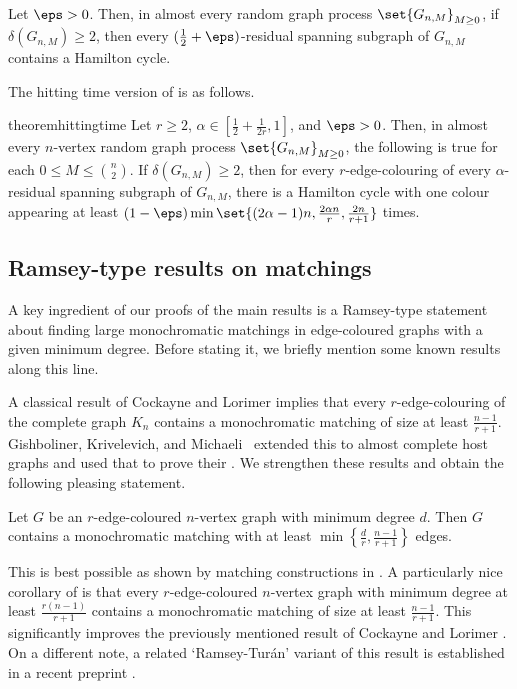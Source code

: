 \documentclass[10pt,a4paper,reqno]{amsart}
\begin{document}
\begin{theorem} 
\label{thm:hittimg time montgomery}
Let $\eps >0$. Then, in almost every random graph process $\set{G_{n,M}}_{M \geq 0}$, if $\delta(G_{n,M}) \geq 2$, then every $(\frac{1}{2}+\eps)$-residual spanning subgraph of $G_{n,M}$ contains a Hamilton cycle.
\end{theorem}

The hitting time version of  is as follows.
\begin{restatable}{theorem}{hittingtime}
  \label{thm:hitting-time-main}
  Let $r \geq 2$, $\alpha \in [\frac{1}{2} + \frac{1}{2r}, 1]$, and $\eps > 0$. Then, in almost every $n$-vertex random graph process $\set{G_{n,M}}_{M \geq 0}$, the following is true for each $0 \leq M \leq \binom{n}{2}$. If $\delta(G_{n,M}) \geq 2$, then for every $r$-edge-colouring of every $\alpha$-residual spanning subgraph of $G_{n,M}$, there is a Hamilton cycle with one colour appearing at least $(1 - \eps) \min\set{(2\alpha - 1)n, \frac{2\alpha n}{r}, \frac{2n}{r+1}}$ times.
\end{restatable}



\subsection{Ramsey-type results on matchings}\label{sec:ramsey matchings}

A key ingredient of our proofs of the main results is a Ramsey-type statement about finding large monochromatic matchings in edge-coloured graphs with a given minimum degree. Before stating it, we briefly mention some known results along this line. 

A classical result of Cockayne and Lorimer \cite{Cockayne1975the} implies that every $r$-edge-colouring of the complete graph $K_n$ contains a monochromatic matching of size at least $\frac{n-1}{r+1}$. Gishboliner, Krivelevich, and Michaeli~\cite{Gishboliner2021colourbiased} extended this to almost complete host graphs and used that to prove their . We strengthen these results and obtain the following pleasing statement.

\begin{theorem}
  \label{thm:intro large monochromatic matching}
  Let $G$ be an $r$-edge-coloured $n$-vertex graph with minimum degree $d$. Then $G$ contains a monochromatic matching with at least $\min\left\{\frac{d}{r}, \frac{n-1}{r+1}\right\}$ edges. 
\end{theorem}
This is best possible as shown by matching constructions in . A particularly nice corollary of  is that every $r$-edge-coloured $n$-vertex graph with minimum degree at least $\frac{r(n-1)}{r+1}$ contains a monochromatic matching of size at least $\frac{n-1}{r+1}$. This significantly improves the previously mentioned result of Cockayne and Lorimer \cite{Cockayne1975the}. On a different note, a related `Ramsey-Tur\'an' variant of this result is established in a recent preprint \cite{Keevash2025a}.
\end{document}

